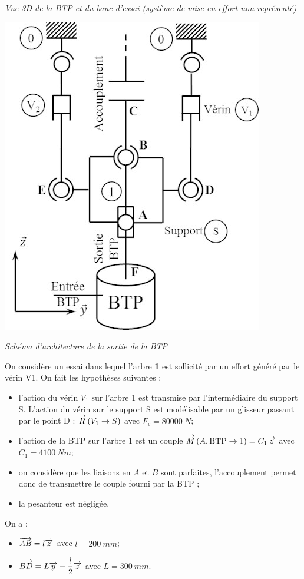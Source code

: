 \documentclass[10pt,fleqn]{article} %
\begin{document}
\begin{multicols}{2}
\begin{center}
\textit{Vue 3D de la BTP et du banc d’essai (système de mise en effort non représenté)}
\end{center}


\begin{center}
\includegraphics[width=.75\linewidth]{images/fig_03}

\textit{Schéma d’architecture de la sortie de la BTP}
\end{center}



 

On considère un essai dans lequel l’arbre \textbf{1} est sollicité par un effort généré par le vérin V1. On fait les hypothèses suivantes :
\begin{itemize}
\item l’action du vérin $V_1$ sur l’arbre 1 est transmise par l’intermédiaire du support S. L’action du vérin sur le support S est modélisable par un glisseur passant par le point D : $\overrightarrow{R}\left( V_1\to S\right)$ avec $F_v=\SI{80 000}{N}$;
\item l’action de la BTP sur l’arbre 1 est un couple $\overrightarrow{M}\left(A,\text{BTP}\to 1 \right)=C_1 \overrightarrow{z}$ avec $C_1=\SI{4 100}{Nm}$;
\item on considère que les liaisons en $A$ et $B$ sont parfaites, l’accouplement permet donc de transmettre le couple fourni par la BTP ;
\item la pesanteur est négligée.
\end{itemize}
On a :
\begin{itemize}
\item $\overrightarrow{AB}=l\overrightarrow{z}$ avec $l=\SI{200}{mm}$;
\item $\overrightarrow{BD}=L\overrightarrow{y}-\dfrac{l}{2}\overrightarrow{z}$ avec $L=\SI{300}{mm}$.
\end{itemize}


\end{multicols}
\end{document}
